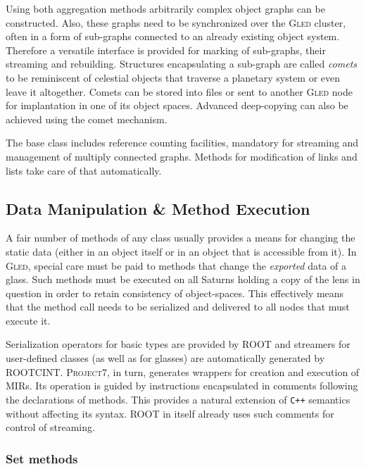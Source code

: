 \documentclass[final]{siamltex}
\def\gled{\textsc{Gled}\xspace}
\def\p7{\textsc{Project7}\xspace}
\def\smalltt#1{{\small\texttt{#1}}}
\begin{document}
Using both aggregation methods arbitrarily complex object graphs can
be constructed. Also, these graphs need to be synchronized over the
\gled cluster, often in a form of sub-graphs connected to an already
existing object system. Therefore a versatile interface is provided
for marking of sub-graphs, their streaming and rebuilding. Structures
encapsulating a sub-graph are called \emph{comets} to be reminiscent
of celestial objects that traverse a planetary system or even leave it
altogether. Comets can be stored into files or sent to another \gled
node for implantation in one of its object spaces. Advanced
deep-copying can also be achieved using the comet mechanism.

The base class includes reference counting facilities, mandatory for
streaming and management of multiply connected graphs. Methods for
modification of links and lists take care of that automatically.


\subsection{Data Manipulation \& Method Execution}

A fair number of methods of any class usually provides a means for
changing the static data (either in an object itself or in an object
that is accessible from it). In \gled, special care must be paid to
methods that change the \emph{exported} data of a glass. Such methods
must be executed on all Saturns holding a copy of the lens in question
in order to retain consistency of object-spaces. This effectively
means that the method call needs to be serialized and delivered to all
nodes that must execute it.

Serialization operators for basic types are provided by ROOT and
streamers for user-defined classes (as well as for glasses) are
automatically generated by ROOTCINT. \p7, in turn, generates wrappers
for creation and execution of MIRs. Its operation is guided by
instructions encapsulated in comments following the declarations of
methods. This provides a natural extension of \smalltt{C++} semantics
without affecting its syntax. ROOT in itself already uses such
comments for control of streaming.

\subsubsection{Set methods} 
\end{document}
